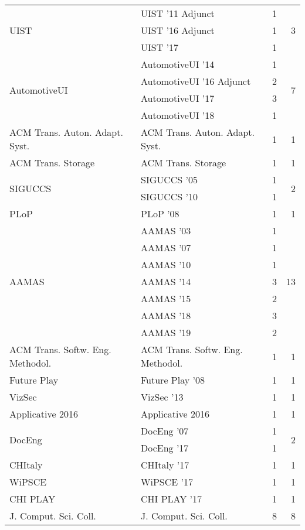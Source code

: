 \begin{table*}[t]
\begin{tabular}{llrr}
\multirow{3}{*}{UIST } & UIST '11 Adjunct & 1 & \multirow{3}{*}{3}\\
& UIST '16 Adjunct & 1 &\\
& UIST '17 & 1 &\\
\multirow{4}{*}{AutomotiveUI } & AutomotiveUI '14 & 1 & \multirow{4}{*}{7}\\
& AutomotiveUI '16 Adjunct & 2 &\\
& AutomotiveUI '17 & 3 &\\
& AutomotiveUI '18 & 1 &\\
\multirow{1}{*}{ACM Trans. Auton. Adapt. Syst.} & ACM Trans. Auton. Adapt. Syst. & 1 & \multirow{1}{*}{1}\\
\multirow{1}{*}{ACM Trans. Storage} & ACM Trans. Storage & 1 & \multirow{1}{*}{1}\\
\multirow{2}{*}{SIGUCCS } & SIGUCCS '05 & 1 & \multirow{2}{*}{2}\\
& SIGUCCS '10 & 1 &\\
\multirow{1}{*}{PLoP } & PLoP '08 & 1 & \multirow{1}{*}{1}\\
\multirow{7}{*}{AAMAS } & AAMAS '03 & 1 & \multirow{7}{*}{13}\\
& AAMAS '07 & 1 &\\
& AAMAS '10 & 1 &\\
& AAMAS '14 & 3 &\\
& AAMAS '15 & 2 &\\
& AAMAS '18 & 3 &\\
& AAMAS '19 & 2 &\\
\multirow{1}{*}{ACM Trans. Softw. Eng. Methodol.} & ACM Trans. Softw. Eng. Methodol. & 1 & \multirow{1}{*}{1}\\
\multirow{1}{*}{Future Play } & Future Play '08 & 1 & \multirow{1}{*}{1}\\
\multirow{1}{*}{VizSec } & VizSec '13 & 1 & \multirow{1}{*}{1}\\
\multirow{1}{*}{Applicative 2016} & Applicative 2016 & 1 & \multirow{1}{*}{1}\\
\multirow{2}{*}{DocEng } & DocEng '07 & 1 & \multirow{2}{*}{2}\\
& DocEng '17 & 1 &\\
\multirow{1}{*}{CHItaly } & CHItaly '17 & 1 & \multirow{1}{*}{1}\\
\multirow{1}{*}{WiPSCE } & WiPSCE '17 & 1 & \multirow{1}{*}{1}\\
\multirow{1}{*}{CHI PLAY } & CHI PLAY '17 & 1 & \multirow{1}{*}{1}\\
\multirow{1}{*}{J. Comput. Sci. Coll.} & J. Comput. Sci. Coll. & 8 & \multirow{1}{*}{8}\\

\end{tabular}
\end{table*}
